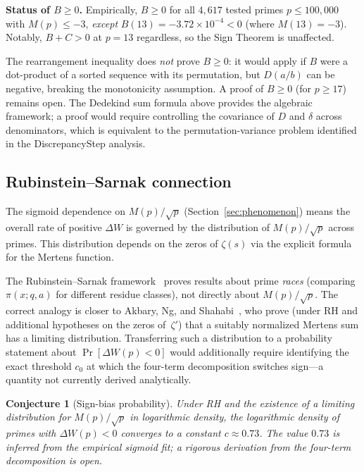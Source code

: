 \documentclass[11pt]{article}
\newtheorem{conjecture}[theorem]{Conjecture}
\theoremstyle{definition}
\begin{document}
\textbf{Status of $B \ge 0$.}
Empirically, $B \ge 0$ for all $4{,}617$ tested primes $p \le 100{,}000$
with $M(p) \le -3$, \emph{except} $B(13) = -3.72 \times 10^{-4} < 0$
(where $M(13) = -3$).  Notably, $B + C > 0$ at $p = 13$ regardless,
so the Sign Theorem is unaffected.

The rearrangement inequality does \emph{not} prove $B \ge 0$:
it would apply if $B$ were a dot-product of a sorted sequence with its
permutation, but $D(a/b)$ can be negative, breaking the monotonicity
assumption.  A proof of $B \ge 0$ (for $p \ge 17$) remains open.
The Dedekind sum formula above provides the algebraic framework;
a proof would require controlling the covariance of $D$ and $\delta$
across denominators, which is equivalent to the permutation-variance
problem identified in the DiscrepancyStep analysis.

\subsection{Rubinstein--Sarnak connection}\label{subsec:rubinstein}

The sigmoid dependence on $M(p)/\sqrt{p}$ (Section~\ref{sec:phenomenon})
means the overall rate of positive $\Delta W$ is governed by the distribution
of $M(p)/\sqrt{p}$ across primes.  This distribution depends on
the zeros of $\zeta(s)$ via the explicit formula for the Mertens
function.

The Rubinstein--Sarnak framework~\cite{RubinsteinSarnak1994} proves
results about prime \emph{races} (comparing $\pi(x;q,a)$ for
different residue classes), not directly about $M(p)/\sqrt{p}$.
The correct analogy is closer to Akbary, Ng, and
Shahabi~\cite{AkbaryNgShahabi2014}, who prove (under RH and additional
hypotheses on the zeros of~$\zeta'$) that a suitably normalized Mertens
sum has a limiting distribution.  Transferring such a distribution to a
probability statement about $\Pr[\Delta W(p) < 0]$ would additionally
require identifying the exact threshold $c_0$ at which the four-term
decomposition switches sign---a quantity not currently derived analytically.

\begin{conjecture}[Sign-bias probability]\label{conj:sign-bias}
Under RH and the existence of a limiting distribution for
$M(p)/\sqrt{p}$ in logarithmic density, the logarithmic density
of primes with $\Delta W(p) < 0$ converges to a constant
$c \approx 0.73$.  The value $0.73$ is inferred from the
empirical sigmoid fit; a rigorous derivation from the four-term
decomposition is open.
\end{conjecture}
\end{document}
